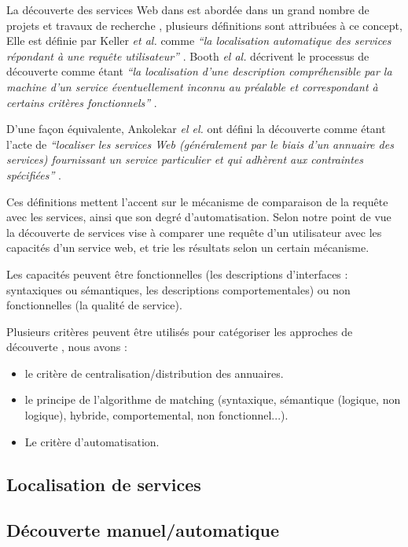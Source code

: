 La découverte des services Web dans est abordée dans un grand nombre
de projets et travaux de recherche \cite{elie2010}, plusieurs
définitions sont attribuées à ce concept, Elle est définie par Keller
\textit{et al.}  comme \textit{``la localisation automatique des
  services répondant à une requête utilisateur''}
\cite{keller2004wsmo}. Booth \textit{el al.}  décrivent le processus
de découverte comme étant \textit{``la localisation d'une description
  compréhensible par la machine d'un service éventuellement inconnu au
  préalable et correspondant à certains critères fonctionnels''}
\cite{booth2004web}.

D'une façon équivalente, Ankolekar \textit{el el.} ont défini la
découverte comme étant l'acte de \textit{``localiser les services Web
(généralement par le biais d'un annuaire des services) fournissant un
service particulier et qui adhèrent aux contraintes spécifiées''}
\cite{ankolekar2002daml}.

Ces définitions mettent l'accent sur le mécanisme de comparaison de la
requête avec les services, ainsi que son degré d'automatisation. Selon
notre point de vue la découverte de services vise à comparer une
requête d'un utilisateur avec les capacités d'un service web, et trie
les résultats selon un certain mécanisme.

Les capacités peuvent être fonctionnelles (les descriptions
d'interfaces : syntaxiques ou sémantiques, les descriptions
comportementales) ou non fonctionnelles (la qualité de service).

Plusieurs critères peuvent être utilisés pour catégoriser les
approches de découverte \cite{elie2010}, nous avons :

\begin{itemize}
\item le critère de centralisation/distribution des annuaires.
\item le principe de l'algorithme de matching (syntaxique, sémantique
  (logique, non logique), hybride, comportemental, non fonctionnel...).
\item Le critère d'automatisation.
\end{itemize}

  \subsection{Localisation de services}
  \label{sec:ws-localisation}

  \subsection{Découverte manuel/automatique}
  \label{sec:ws-desc:manual-vs-auto}

